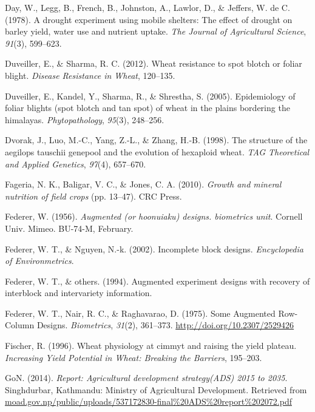 \documentclass[12pt,oneside]{dukestatscithesis} %
\theoremstyle{definition}
\theoremstyle{definition}
\theoremstyle{definition}
\theoremstyle{remark}
\begin{document}
\hypertarget{ref-day1978drought}{}
Day, W., Legg, B., French, B., Johnston, A., Lawlor, D., \& Jeffers, W.
de C. (1978). A drought experiment using mobile shelters: The effect of
drought on barley yield, water use and nutrient uptake. \emph{The
Journal of Agricultural Science}, \emph{91}(3), 599--623.

\hypertarget{ref-duveiller2012wheat}{}
Duveiller, E., \& Sharma, R. C. (2012). Wheat resistance to spot blotch
or foliar blight. \emph{Disease Resistance in Wheat}, 120--135.

\hypertarget{ref-duveiller2005epidemiology}{}
Duveiller, E., Kandel, Y., Sharma, R., \& Shrestha, S. (2005).
Epidemiology of foliar blights (spot blotch and tan spot) of wheat in
the plains bordering the himalayas. \emph{Phytopathology}, \emph{95}(3),
248--256.

\hypertarget{ref-dvorak1998structure}{}
Dvorak, J., Luo, M.-C., Yang, Z.-L., \& Zhang, H.-B. (1998). The
structure of the aegilops tauschii genepool and the evolution of
hexaploid wheat. \emph{TAG Theoretical and Applied Genetics},
\emph{97}(4), 657--670.

\hypertarget{ref-fageria2010growth}{}
Fageria, N. K., Baligar, V. C., \& Jones, C. A. (2010). \emph{Growth and
mineral nutrition of field crops} (pp. 13--47). CRC Press.

\hypertarget{ref-federer1956augmented}{}
Federer, W. (1956). \emph{Augmented (or hoonuiaku) designs. biometrics
unit}. Cornell Univ. Mimeo. BU-74-M, February.

\hypertarget{ref-federer_incomplete_2002}{}
Federer, W. T., \& Nguyen, N.-k. (2002). Incomplete block designs.
\emph{Encyclopedia of Environmetrics}.

\hypertarget{ref-federer_augmented_1994}{}
Federer, W. T., \& others. (1994). Augmented experiment designs with
recovery of interblock and intervariety information.

\hypertarget{ref-federer_augmented_1975}{}
Federer, W. T., Nair, R. C., \& Raghavarao, D. (1975). Some Augmented
Row-Column Designs. \emph{Biometrics}, \emph{31}(2), 361--373.
\url{http://doi.org/10.2307/2529426}

\hypertarget{ref-fischer1996wheat}{}
Fischer, R. (1996). Wheat physiology at cimmyt and raising the yield
plateau. \emph{Increasing Yield Potential in Wheat: Breaking the
Barriers}, 195--203.

\hypertarget{ref-ads2072_report}{}
GoN. (2014). \emph{Report: Agricultural development strategy(ADS) 2015
to 2035}. Singhdurbar, Kathmandu: Ministry of Agricultural Development.
Retrieved from
\href{moad.gov.np/public/uploads/537172830-final\%20ADS\%20report\%202072.pdf\%0A}{moad.gov.np/public/uploads/537172830-final\%20ADS\%20report\%202072.pdf
}
\end{document}
